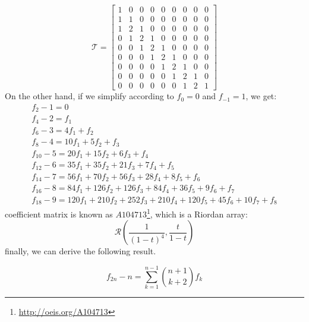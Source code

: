 \begin{displaymath}
    \mathcal{T} = \left[\begin{array}{ccccccccc}
        1 & 0 & 0 & 0 & 0 & 0 & 0 & 0 & 0\\
        1 & 1 & 0 & 0 & 0 & 0 & 0 & 0 & 0\\
        1 & 2 & 1 & 0 & 0 & 0 & 0 & 0 & 0\\
        0 & 1 & 2 & 1 & 0 & 0 & 0 & 0 & 0\\
        0 & 0 & 1 & 2 & 1 & 0 & 0 & 0 & 0\\
        0 & 0 & 0 & 1 & 2 & 1 & 0 & 0 & 0\\
        0 & 0 & 0 & 0 & 1 & 2 & 1 & 0 & 0\\
        0 & 0 & 0 & 0 & 0 & 1 & 2 & 1 & 0\\
        0 & 0 & 0 & 0 & 0 & 0 & 1 & 2 & 1
        \end{array}\right]
\end{displaymath}
On the other hand, if we simplify according to $f_{0}=0$ and
$f_{-1}=1$, we get:
\begin{displaymath}
    \begin{array}{c}
        f_{2} - 1=0\\
        f_{4} - 2=f_{1}\\
        f_{6} - 3=4f_{1} + f_{2}\\
        f_{8} - 4=10f_{1} + 5 f_{2} + f_{3}\\
        f_{10} - 5=20f_{1} + 15 f_{2} + 6 f_{3} + f_{4}\\
        f_{12} - 6=35f_{1} + 35 f_{2} + 21 f_{3} + 7 f_{4} + f_{5}\\
        f_{14} - 7=56f_{1} + 70 f_{2} + 56 f_{3} + 28 f_{4} + 8 f_{5} + f_{6}\\
        f_{16} - 8=84f_{1} + 126 f_{2} + 126 f_{3} + 84 f_{4} + 36 f_{5} + 9 f_{6} + f_{7}\\
        f_{18} - 9 = 120 f_{1} + 210 f_{2} + 252 f_{3} + 210 f_{4} + 120 f_{5} + 45 f_{6} + 10 f_{7} + f_{8}
        \end{array}
\end{displaymath}
coefficient matrix is known as $A104713$\footnote{\url{http://oeis.org/A104713}},
which is a Riordan array:
\begin{displaymath}
    \mathcal{R}\left(\frac{1}{(1-t)^4}, \frac{t}{1-t}\right)
\end{displaymath}
finally, we can derive the following result.

\begin{thm}
    \begin{displaymath}
        f_{2n} - n = \sum_{k=1}^{n-1}{{{n+1}\choose{k+2}}f_{k}}
    \end{displaymath}
\end{thm}

